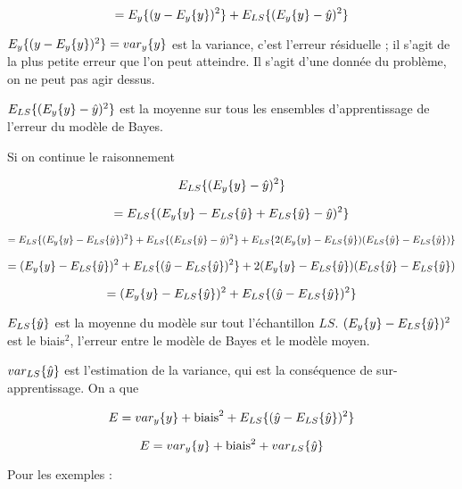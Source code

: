 	$$=E_y\{(y - E_y\{y\})^2\} + E_{LS}\{(E_y\{y\} - \hat{y})^2\}$$
	
	$E_y\{(y - E_y\{y\})^2\} = var_y\{y\}$ est la variance, c'est l'erreur résiduelle ; il s'agit de la plus petite erreur que l'on peut atteindre. Il s'agit d'une donnée du problème, on ne peut pas agir dessus.
	
	$E_{LS}\{(E_y\{y\} - \hat{y})^2\}$ est la moyenne sur tous les ensembles d'apprentissage de l'erreur du modèle de Bayes.
	
	
	Si on continue le raisonnement
	
	$$E_{LS}\{(E_y\{y\} - \hat{y})^2\}$$
	
	$$ = E_{LS}\{(E_y\{y\} - E_{LS}\{\hat{y}\} + E_{LS}\{\hat{y}\} - \hat{y})^2\}$$
	
	$$ = E_{LS}\{(E_y\{y\} - E_{LS}\{\hat{y}\})^2\} + E_{LS}\{(E_{LS}\{\hat{y}\} - \hat{y})^2\} + E_{LS}\{2(E_y\{y\} - E_{LS}\{\hat{y}\})(E_{LS}\{\hat{y}\} - E_{LS}\{\hat{y}\})\}$$
	
	$$= (E_y\{y\} - E_{LS}\{\hat{y}\})^2 + E_{LS}\{(\hat{y} - E_{LS}\{\hat{y}\})^2\} + 2(E_y\{y\} - E_{LS}\{\hat{y}\})(E_{LS}\{\hat{y}\} - E_{LS}\{\hat{y}\})$$
	
	$$= (E_y\{y\} - E_{LS}\{\hat{y}\})^2 + E_{LS}\{(\hat{y} - E_{LS}\{\hat{y}\})^2\}$$

		
	$E_{LS}\{\hat{y}\}$ est la moyenne du modèle sur tout l'échantillon $LS$. $(E_y\{y\} - E_{LS}\{\hat{y}\})^2$ est le biais$^2$, l'erreur entre le modèle de Bayes et le modèle moyen.
		
	
	$var_{LS}\{\hat{y}\}$ est l'estimation de la variance, qui est la conséquence de sur-apprentissage. On a que
	
	$$E = var_y\{y\} + \text{biais}^2 + E_{LS}\{(\hat{y} - E_{LS}\{\hat{y}\})^2\}$$
	
	
	$$E = var_y\{y\} + \text{biais}^2 + var_{LS}\{\hat{y}\}$$
	
	Pour les exemples :
	
